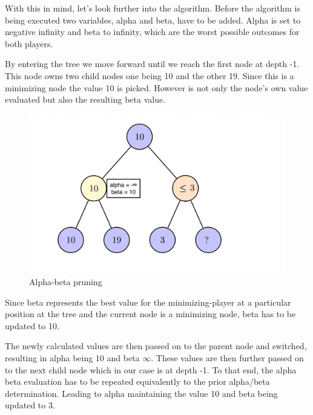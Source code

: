 \documentclass[conference,pdf,table,xcdraw, utf8]{IEEEtran}
\begin{document}
With this in mind, let's look further into the algorithm.
Before the algorithm is being executed two variables, alpha and beta, have to be added.
Alpha is set to negative infinity and beta to infinity, which are the worst possible outcomes for both players.

By entering the tree we move forward until we reach the first node at depth -1. This node owns two child nodes one being 10 and the other 19. Since this is a minimizing node the value 10 is picked. However is not only the node's own value evaluated but also the resulting beta value.

\begin{figure}[H]
    \centering
    \includegraphics[scale=0.23]{images/pruning_tree3.png}
    \caption{Alpha-beta pruning}
    \label{figure:prunning3}
\end{figure}

Since beta represents the best value for the minimizing-player at a particular position at the tree and the current node is a minimizing node, beta has to be updated to 10.

The newly calculated values are then passed on to the parent node and switched, resulting in alpha being 10 and beta  $\infty $. These values are then further passed on to the next child node which in our case is at depth -1. To that end, the alpha beta evaluation has to be repeated equivalently to the prior alpha/beta determination. Leading to alpha maintaining the value 10 and beta being updated to 3.
\end{document}
